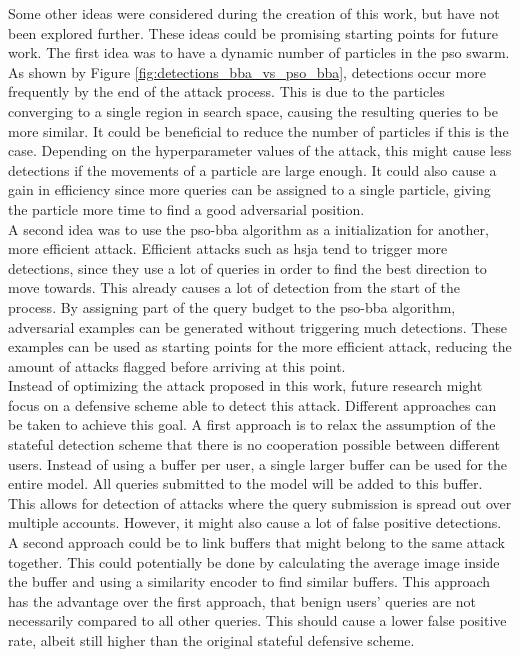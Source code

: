 Some other ideas were considered during the creation of this work, but have not been explored further. These ideas could be promising starting points for future work. The first idea was to have a dynamic number of particles in the \gls{pso} swarm. As shown by Figure \ref{fig:detections_bba_vs_pso_bba}, detections occur more frequently by the end of the attack process. This is due to the particles converging to a single region in search space, causing the resulting queries to be more similar. It could be beneficial to reduce the number of particles if this is the case. Depending on the hyperparameter values of the attack, this might cause less detections if the movements of a particle are large enough. It could also cause a gain in efficiency since more queries can be assigned to a single particle, giving the particle more time to find a good adversarial position.\\

A second idea was to use the \gls{pso}-\gls{bba} algorithm as a initialization for another, more efficient attack. Efficient attacks such as \gls{hsja} tend to trigger more detections, since they use a lot of queries in order to find the best direction to move towards. This already causes a lot of detection from the start of the process. By assigning part of the query budget to the \gls{pso}-\gls{bba} algorithm, adversarial examples can be generated without triggering much detections. These examples can be used as starting points for the more efficient attack, reducing the amount of attacks flagged before arriving at this point.\\

Instead of optimizing the attack proposed in this work, future research might focus on a defensive scheme able to detect this attack. Different approaches can be taken to achieve this goal. A first approach is to relax the assumption of the stateful detection scheme that there is no cooperation possible between different users. Instead of using a buffer per user, a single larger buffer can be used for the entire model. All queries submitted to the model will be added to this buffer. This allows for detection of attacks where the query submission is spread out over multiple accounts. However, it might also cause a lot of false positive detections.\\ 

A second approach could be to link buffers that might belong to the same attack together. This could potentially be done by calculating the average image inside the buffer and using a similarity encoder to find similar buffers. This approach has the advantage over the first approach, that benign users' queries are not necessarily compared to all other queries. This should cause a lower false positive rate, albeit still higher than the original stateful defensive scheme.\\

